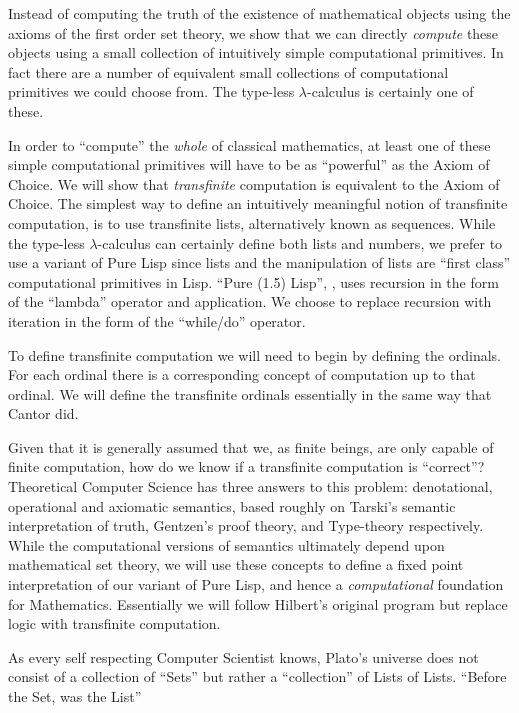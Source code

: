 Instead of computing the truth of the existence of mathematical objects using
the axioms of the first order set theory, we show that we can directly
\emph{compute} these objects using a small collection of intuitively simple
computational primitives. In fact there are a number of equivalent small
collections of computational primitives we could choose from. The type-less
$\lambda$-calculus is certainly one of these.

In order to ``compute'' the \emph{whole} of classical mathematics, at least one
of these simple computational primitives will have to be as ``powerful'' as the
Axiom of Choice. We will show that \emph{transfinite} computation is equivalent
to the Axiom of Choice. The simplest way to define an intuitively meaningful
notion of transfinite computation, is to use transfinite lists, alternatively
known as sequences. While the type-less $\lambda$-calculus can certainly define
both lists and numbers, we prefer to use a variant of Pure Lisp since lists and
the manipulation of lists are ``first class'' computational primitives in Lisp.
``Pure (1.5) Lisp'', \cite{mcCarthy1960lisp}, uses recursion in the form of the
``lambda'' operator and application. We choose to replace recursion with
iteration in the form of the ``while/do'' operator.

To define transfinite computation we will need to begin by defining the
ordinals. For each ordinal there is a corresponding concept of computation up to
that ordinal. We will define the transfinite ordinals essentially in the same
way that Cantor did. 

Given that it is generally assumed that we, as finite beings, are only capable
of finite computation, how do we know if a transfinite computation is
``correct''? Theoretical Computer Science has three answers to this problem:
denotational, operational and axiomatic semantics, based roughly on Tarski's
semantic interpretation of truth, Gentzen's proof theory, and Type-theory
respectively. While the computational versions of semantics ultimately depend
upon mathematical set theory, we will use these concepts to define a fixed point
interpretation of our variant of Pure Lisp, and hence a \emph{computational}
foundation for Mathematics. Essentially we will follow Hilbert's original
program but replace logic with transfinite computation.

\begin{myQuote}
As every self respecting Computer Scientist knows, Plato's universe does not
consist of a collection of ``Sets'' but rather a ``collection'' of Lists of
Lists. \quad ``Before the Set, was the List''
\end{myQuote}

